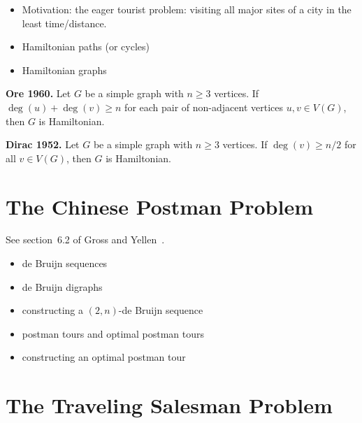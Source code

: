 \begin{itemize}
\item Motivation: the eager tourist problem: visiting all major sites
  of a city in the least time/distance.

\item Hamiltonian paths (or cycles)

\item Hamiltonian graphs
\end{itemize}

\begin{theorem}
\textbf{Ore 1960.}
Let $G$ be a simple graph with $n \geq 3$ vertices. If
$\deg(u) + \deg(v) \geq n$ for each pair of non-adjacent vertices
$u, v \in V(G)$, then $G$ is Hamiltonian.
\end{theorem}

\begin{corollary}
\textbf{Dirac 1952.}
Let $G$ be a simple graph with $n \geq 3$ vertices. If
$\deg(v) \geq n / 2$ for all $v \in V(G)$, then $G$ is Hamiltonian.
\end{corollary}



\section{The Chinese Postman Problem}

See section~6.2 of Gross and Yellen~\cite{GrossYellen1999}.

\begin{itemize}
\item de Bruijn sequences

\item de Bruijn digraphs

\item constructing a $(2, n)$-de Bruijn sequence

\item postman tours and optimal postman tours

\item constructing an optimal postman tour
\end{itemize}



\section{The Traveling Salesman Problem}

